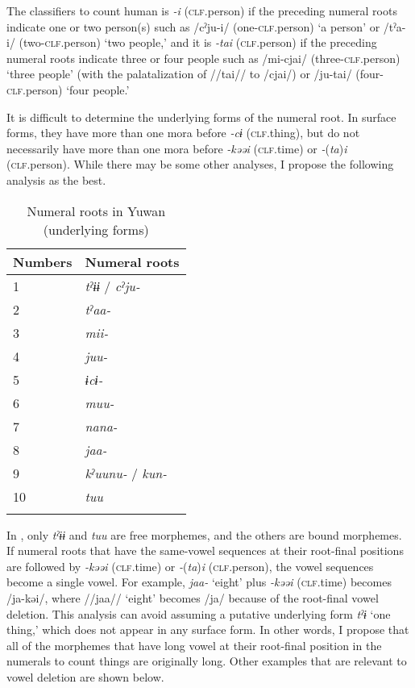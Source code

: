   The classifiers to count human is \textit{{}-i} (\textsc{clf}.person) if the preceding numeral roots indicate one or two person(s) such as /cˀju-i/ (one-\textsc{clf}.person) ‘a person’ or /tˀa-i/ (two-\textsc{clf}.person) ‘two people,’ and it is \textit{{}-tai} (\textsc{clf}.person) if the preceding numeral roots indicate three or four people such as /mi-cjai/ (three-\textsc{clf}.person) ‘three people’ (with the palatalization of //tai// to /cjai/) or /ju-tai/ (four-\textsc{clf}.person) ‘four people.’

  It is difficult to determine the underlying forms of the numeral root. In surface forms, they have more than one mora before \textit{{}-cɨ} (\textsc{clf}.thing), but do not necessarily have more than one mora before \textit{{}-kəəi} (\textsc{clf}.time) or \textit{{}-}(\textit{ta})\textit{i} (\textsc{clf}.person). While there may be some other analyses, I propose the following analysis as the best.

\begin{table}
\caption{\label{tab:key:51} Numeral roots in Yuwan (underlying forms)}
\begin{tabular}{ll}
\lsptoprule
Numbers & Numeral roots\\
\midrule
1  &\textit{tˀɨɨ} / \textit{cˀju-}      \\
2  &\textit{tˀaa-}                      \\
3  &\textit{mii-}                       \\
4  &\textit{juu-}                       \\
5  &\textit{ɨcɨ-}                       \\
6  &\textit{muu-}                       \\
7  &\textit{nana-}                      \\
8  &\textit{jaa-}                       \\
9  &\textit{kˀuunu-} / \textit{kun-}    \\
10 & \textit{tuu}                         \\
\lspbottomrule
\end{tabular}
\end{table}

{In , only} {\textit{tˀɨɨ} and} {\textit{tuu} are free morphemes, and the others are bound morphemes. If numeral roots that have the same-vowel sequences at their root-final positions are followed by} {\textit{{}-kəəi} (\textsc{clf}.time) or} {\textit{{}-}}{(}{\textit{ta}}{)}{\textit{i} }{(\textsc{clf}.person), the vowel sequences become a single vowel. For example,} {\textit{jaa-} ‘eight’ plus} {\textit{{}-kəəi} (\textsc{clf}.time) becomes /ja-kəi/, where //jaa// ‘eight’ becomes /ja/ because of the root-final vowel deletion. This analysis} {can avoid assuming a putative underlying form} {\textit{tˀɨ} ‘one thing,’ which does not appear in any surface form. In other words, I propose that all of the morphemes that have long vowel at their root-final position in the numerals to count things are originally long. Other examples that are relevant to vowel deletion are shown below.}

